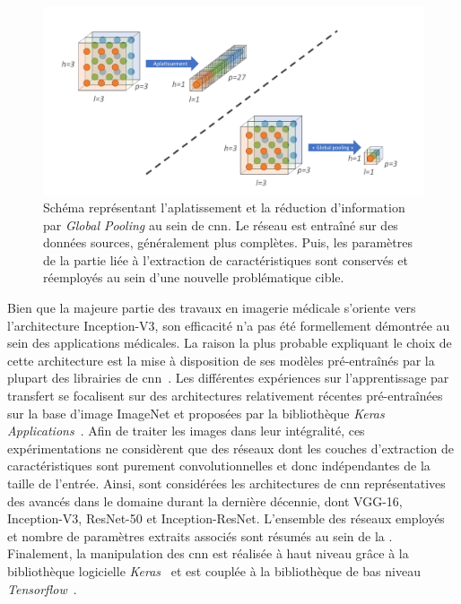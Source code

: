 \begin{figure}[H]
    \centering
    \includegraphics[width=\linewidth]{contents/chapter_5/resources/scheme_global_pooling.pdf}
    \caption{Schéma représentant l'aplatissement et la réduction d'information par \textit{Global Pooling} au sein de \gls{cnn}. Le réseau est entraîné sur des données sources, généralement plus complètes. Puis, les paramètres de la partie liée à l'extraction de caractéristiques sont conservés et réemployés au sein d'une nouvelle problématique cible.}
    \label{fig:scheme_global_pooling}
\end{figure}\par

Bien que la majeure partie des travaux en imagerie médicale s'oriente vers l'architecture Inception-V3, son efficacité n'a pas été formellement démontrée au sein des applications médicales. La raison la plus probable expliquant le choix de cette architecture est la mise à disposition de ses modèles pré-entraînés par la plupart des librairies de \gls{cnn}~\cite{Litjens2017}. Les différentes expériences sur l'apprentissage par transfert se focalisent sur des architectures relativement récentes pré-entraînées sur la base d'image ImageNet et proposées par la bibliothèque \textit{Keras Applications}~\cite{chollet2015a}. Afin de traiter les images dans leur intégralité, ces expérimentations ne considèrent que des réseaux dont les couches d'extraction de caractéristiques sont purement convolutionnelles et donc indépendantes de la taille de l'entrée. Ainsi, sont considérées les architectures de \gls{cnn} représentatives des avancés dans le domaine durant la dernière décennie, dont VGG-16, Inception-V3, ResNet-50 et Inception-ResNet. L'ensemble des réseaux employés et nombre de paramètres extraits associés sont résumés au sein de la . Finalement, la manipulation des \ac{cnn} est réalisée à haut niveau grâce à la bibliothèque logicielle \textit{Keras}~\cite{chollet2015} et est couplée à la bibliothèque de bas niveau \textit{Tensorflow}~\cite{tensorflow2015}.\par

